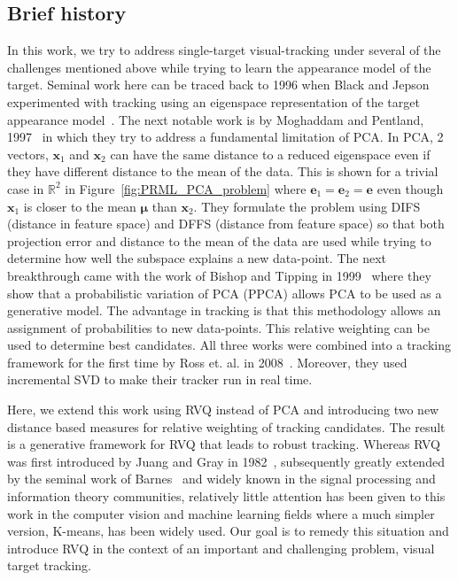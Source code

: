 \subsection{Brief history}
In this work, we try to address single-target visual-tracking under several of the challenges mentioned above while trying to learn the appearance model of the target.  Seminal work here can be traced back to 1996 when Black and Jepson experimented with tracking using an eigenspace representation of the target appearance model~\cite{1998_JNL_Eigentracking_Black}.  The next notable work is by Moghaddam and Pentland, 1997~\cite{1997_JNL_EigenTRK_Moghaddam} in which they try to address a fundamental limitation of PCA.  In PCA, 2 vectors, $\mathbf{x}_1$ and $\mathbf{x}_2$ can have the same distance to a reduced eigenspace even if they have different distance to the mean of the data.  This is shown for a trivial case in $\mathbb{R}^2$ in Figure~\ref{fig:PRML_PCA_problem} where $\mathbf{e}_1=\mathbf{e}_2=\mathbf{e}$ even though $\mathbf{x}_1$ is closer to the mean $\boldsymbol\mu$ than $\mathbf{x}_2$.  They formulate the problem using DIFS (distance in feature space) and DFFS (distance from feature space) so that both projection error and distance to the mean of the data are used while trying to determine how well the subspace explains a new data-point.  The next breakthrough came with the work of Bishop and Tipping in 1999~\cite{1999_JNL_PPCA_Tipping} where they show that a probabilistic variation of PCA (PPCA) allows PCA to be used as a generative model.  The advantage in tracking is that this methodology allows an assignment of probabilities to new data-points.  This relative weighting can be used to determine best candidates.  All three works were combined into a tracking framework for the first time by Ross et. al. in 2008~\cite{2008_JNL_subspaceTRK_Ross}.  Moreover, they used incremental SVD to make their tracker run in real time.  

Here, we extend this work using RVQ instead of PCA and introducing two new distance based measures for relative weighting of tracking candidates.  The result is a generative framework for RVQ that leads to robust tracking.  Whereas RVQ was first introduced by Juang and Gray in 1982~\cite{1982_CNF_SpeechRVQ_JuangGray}, subsequently greatly extended by the seminal work of Barnes~\cite{1991_CNF_DesignPerformanceRVQ_Frost,1992_JNL_RVQ_Barnes,1992_CNF_ImageCodingRVQ_Kossentini,1993_sigmaTrees_Barnes,1993_JNL_RVQDSC_Barnes,1995_JNL_OptimalityRVQ_Kossentini,1996_CNF_VQclassification_Barnes,1996_JNL_AdvancesRVQ_Barnes,2002_JNL_SigmaTrees_Barnes,2004_CNF_DSSAdataMining_Barnes,2007_JNL_Katrina_Barnes,2007_JNL_IDDM_Barnes} and widely known in the signal processing and information theory communities, relatively little attention has been given to this work in the computer vision and machine learning fields where a much simpler version, K-means, has been widely used.  Our goal is to remedy this situation and introduce RVQ in the context of an important and challenging problem, visual target tracking.

